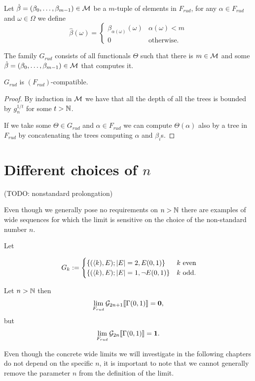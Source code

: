 \begin{defi}
Let $\hat\beta=(\beta_0,\dots,\beta_{m-1})\in\mathcal{M}$ be a $m$-tuple of elements in $F_{rud}$, for any $\alpha\in F_{rud}$ and $\omega\in\Omega$ we define
\[\hat\beta(\omega)=
\begin{cases}
\beta_{\alpha(\omega)}(\omega)&\alpha(\omega)<m\\
0&\text{otherwise.}
\end{cases}\]
\end{defi}

\begin{defi}
The family $G_{rud}$ consists of all functionals $\Theta$ such that there is $m\in\mathcal{M}$ and some $\hat \beta=(\beta_0,\dots,\beta_{m-1})\in\mathcal{M}$ that computes it.
\end{defi}

\begin{lemm}
$G_{rud}$ is $(F_{rud})$-compatible.
\end{lemm}
\begin{proof}
By induction in $\mathcal{M}$ we have that all the depth of all the trees is bounded by $g_n^{1/t}$ for some $t>\mathbb{N}$.

If we take some $\Theta\in G_{rud}$ and $\alpha\in F_{rud}$ we can compute $\Theta(\alpha)$ also by a tree in $F_{rud}$ by concatenating the trees computing $\alpha$ and $\beta_i$s.
\end{proof}

\section{Different choices of $n$}

(TODO: nonstandard prolongation)

Even though we generally pose no requirements on $n>\mathbb{N}$ there are examples of wide sequences for which the limit is sensitive on the choice of the non-standard number $n$. 

\begin{exam}
Let 

\[\
G_{k}:=
\begin{cases}
\{(\langle k),E);\left|{E}\right|=2,E(0,1)\}&\text{$k$ even}\\
\{(\langle k),E);\left|{E}\right|=1,\lnot E(0,1)\}&\text{$k$ odd.}\\
\end{cases}\]

Let $n>\mathbb{N}$ then
\begin{align}
\lim_{F_{rud}}\mathcal{G}_{2n+1} \llbracket \Gamma(0,1)\rrbracket =\textbf{0},
\end{align}
but
\begin{align}
\lim_{F_{rud}}\mathcal{G}_{2n}\llbracket \Gamma(0,1)\rrbracket=\textbf{1}.
\end{align}

Even though the concrete wide limits we will investigate in the following chapters do not depend on the specific $n$, it is important to note that we cannot generally remove the parameter $n$ from the definition of the limit.
\end{exam}

